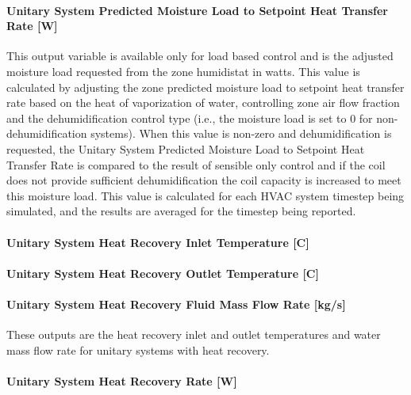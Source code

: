 \paragraph{Unitary System Predicted Moisture Load to Setpoint Heat Transfer Rate {[}W{]}}\label{unitary-system-predicted-moisture-load-to-setpoint-heat-transfer-rate-w}

This output variable is available only for load based control and is the adjusted moisture load requested from the zone humidistat in watts. This value is calculated by adjusting the zone predicted moisture load to setpoint heat transfer rate based on the heat of vaporization of water, controlling zone air flow fraction and the dehumidification control type (i.e., the moisture load is set to 0 for non-dehumidification systems). When this value is non-zero and dehumidification is requested, the Unitary System Predicted Moisture Load to Setpoint Heat Transfer Rate is compared to the result of sensible only control and if the coil does not provide sufficient dehumidification the coil capacity is increased to meet this moisture load. This value is calculated for each HVAC system timestep being simulated, and the results are averaged for the timestep being reported.


\paragraph{Unitary System Heat Recovery Inlet Temperature {[}C{]}}\label{unitary-system-heat-recovery-inlet-temperature-c}

\paragraph{Unitary System Heat Recovery Outlet Temperature {[}C{]}}\label{unitary-system-heat-recovery-outlet-temperature-c}

\paragraph{Unitary System Heat Recovery Fluid Mass Flow Rate {[}kg/s{]}}\label{unitary-system-heat-recovery-fluid-mass-flow-rate-kgs}

These outputs are the heat recovery inlet and outlet temperatures and water mass flow rate for unitary systems with heat recovery.

\paragraph{Unitary System Heat Recovery Rate {[}W{]}}\label{unitary-system-heat-recovery-rate-w}

